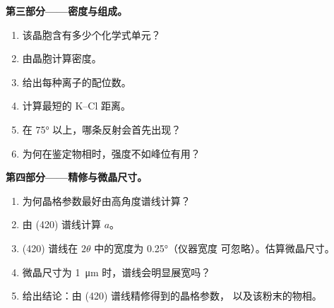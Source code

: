 \begin{problem}
\medskip\noindent\textbf{第三部分——密度与组成。}
\begin{enumerate}[resume]
  \item 该晶胞含有多少个化学式单元？
  \item 由晶胞计算密度。
  \item 给出每种离子的配位数。
  \item 计算最短的 K--Cl 距离。
  \item 在 \ang{75} 以上，哪条反射会首先出现？
  \item 为何在鉴定物相时，强度不如峰位有用？
\end{enumerate}

\medskip\noindent\textbf{第四部分——精修与微晶尺寸。}
\begin{enumerate}[resume]
  \item 为何晶格参数最好由高角度谱线计算？
  \item 由 (420) 谱线计算 $a$。
  \item (420) 谱线在 $2\theta$ 中的宽度为 \ang{0.25}（仪器宽度
        可忽略）。估算微晶尺寸。
  \item 微晶尺寸为 \qty{1}{\micro m} 时，谱线会明显展宽吗？
  \item 给出结论：由 (420) 谱线精修得到的晶格参数，
        以及该粉末的物相。
\end{enumerate}
\end{problem}
